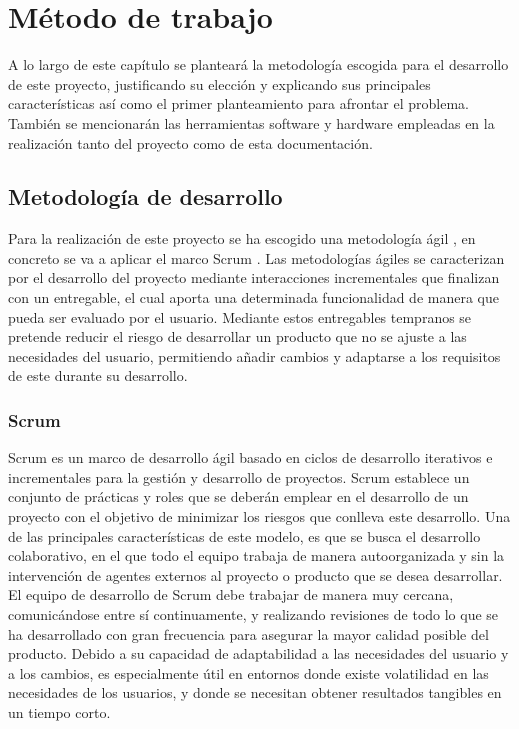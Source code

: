 \chapter{Método de trabajo}
\label{chap:metodo}

A lo largo de este capítulo se planteará la metodología escogida para el desarrollo de este proyecto, justificando su elección y explicando sus principales características así como el  primer planteamiento para afrontar el problema. También se mencionarán las herramientas software y hardware empleadas en la realización tanto del proyecto como de esta documentación.


\section{Metodología de desarrollo}

Para la realización de este proyecto se ha escogido una metodología ágil \cite{ilieva2004analyses}, en concreto se va a aplicar el marco Scrum \cite{schwaber2004agile}. Las metodologías ágiles se caracterizan por el desarrollo del proyecto mediante interacciones incrementales que finalizan con un entregable, el cual aporta una determinada funcionalidad de manera que pueda ser evaluado por el usuario. Mediante estos entregables tempranos se pretende reducir el riesgo de desarrollar un producto que no se ajuste a las necesidades del usuario, permitiendo añadir cambios y adaptarse a los requisitos de este durante su desarrollo.

\subsection{Scrum}

Scrum es un marco de desarrollo ágil basado en ciclos de desarrollo iterativos e incrementales para la gestión y desarrollo de proyectos. Scrum establece un conjunto de prácticas y roles que se deberán emplear en el desarrollo de un proyecto con el objetivo de minimizar los riesgos que conlleva este desarrollo. Una de las principales características de este modelo, es que se busca el desarrollo colaborativo, en el que todo el equipo trabaja de manera autoorganizada y sin la intervención de agentes externos al proyecto o producto que se desea desarrollar. El equipo de desarrollo de Scrum debe trabajar de manera muy cercana, comunicándose entre sí continuamente, y realizando revisiones de todo lo que se ha desarrollado con gran frecuencia para asegurar la mayor calidad posible del producto. Debido a su capacidad de adaptabilidad a las necesidades del usuario y a los cambios, es especialmente útil en entornos donde existe volatilidad en las necesidades de los usuarios, y donde se necesitan obtener resultados tangibles en un tiempo corto. 

